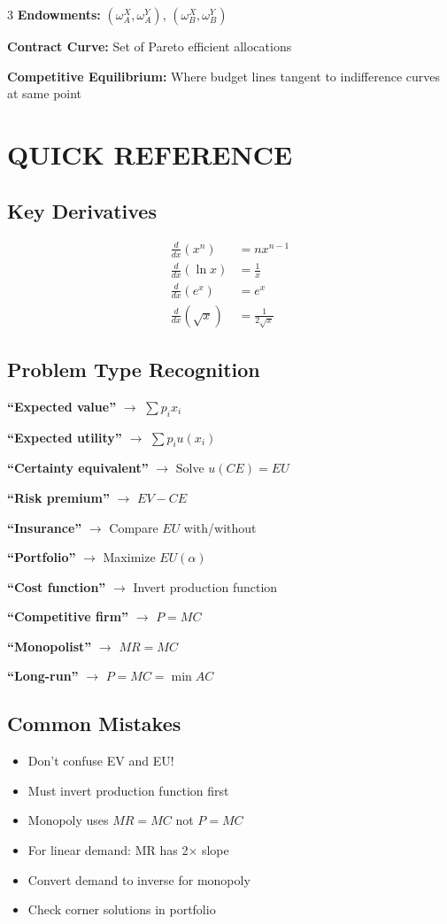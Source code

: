 \documentclass[8pt,landscape,letterpaper]{extarticle}
\begin{document}
\begin{multicols}{3}
\textbf{Endowments:} $(\omega_A^X, \omega_A^Y)$, $(\omega_B^X, \omega_B^Y)$

\textbf{Contract Curve:} Set of Pareto efficient allocations

\textbf{Competitive Equilibrium:} Where budget lines tangent to indifference curves at same point

\section*{QUICK REFERENCE}

\subsection*{Key Derivatives}
\begin{align*}
\frac{d}{dx}(x^n) &= nx^{n-1} \\
\frac{d}{dx}(\ln x) &= \frac{1}{x} \\
\frac{d}{dx}(e^x) &= e^x \\
\frac{d}{dx}(\sqrt{x}) &= \frac{1}{2\sqrt{x}}
\end{align*}

\subsection*{Problem Type Recognition}
\textbf{``Expected value''} $\rightarrow$ $\sum p_i x_i$

\textbf{``Expected utility''} $\rightarrow$ $\sum p_i u(x_i)$

\textbf{``Certainty equivalent''} $\rightarrow$ Solve $u(CE) = EU$

\textbf{``Risk premium''} $\rightarrow$ $EV - CE$

\textbf{``Insurance''} $\rightarrow$ Compare $EU$ with/without

\textbf{``Portfolio''} $\rightarrow$ Maximize $EU(\alpha)$

\textbf{``Cost function''} $\rightarrow$ Invert production function

\textbf{``Competitive firm''} $\rightarrow$ $P = MC$

\textbf{``Monopolist''} $\rightarrow$ $MR = MC$

\textbf{``Long-run''} $\rightarrow$ $P = MC = \min AC$

\subsection*{Common Mistakes}
\begin{itemize}
\item Don't confuse EV and EU!
\item Must invert production function first
\item Monopoly uses $MR = MC$ not $P = MC$
\item For linear demand: MR has 2× slope
\item Convert demand to inverse for monopoly
\item Check corner solutions in portfolio
\end{itemize}

\end{multicols}
\end{document}

